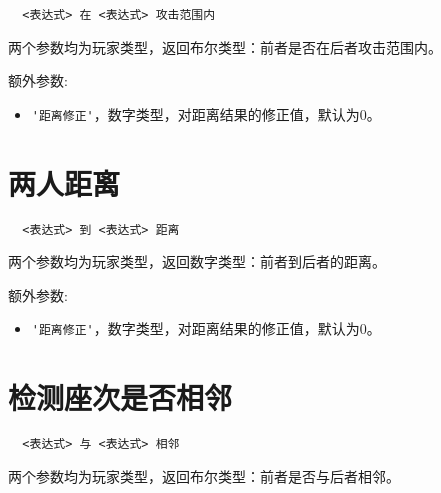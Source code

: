 \begin{verbatim}
  <表达式> 在 <表达式> 攻击范围内
\end{verbatim}

两个参数均为玩家类型，返回布尔类型：前者是否在后者攻击范围内。

额外参数:
\begin{itemize}
  \item \verb|'距离修正'|，数字类型，对距离结果的修正值，默认为0。
\end{itemize}

\section{两人距离}

\begin{verbatim}
  <表达式> 到 <表达式> 距离
\end{verbatim}

两个参数均为玩家类型，返回数字类型：前者到后者的距离。

额外参数:
\begin{itemize}
  \item \verb|'距离修正'|，数字类型，对距离结果的修正值，默认为0。
\end{itemize}

\section{检测座次是否相邻}

\begin{verbatim}
  <表达式> 与 <表达式> 相邻
\end{verbatim}

两个参数均为玩家类型，返回布尔类型：前者是否与后者相邻。